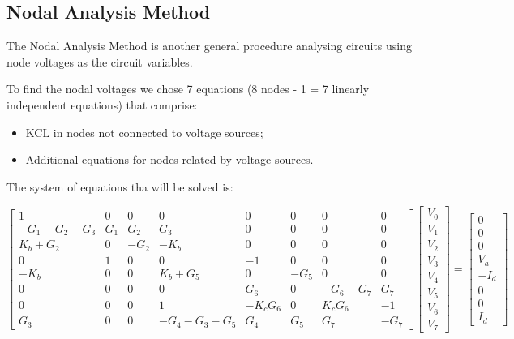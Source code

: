 \subsection{Nodal Analysis Method}

\hspace{0,5cm} The Nodal Analysis Method is another general procedure analysing circuits using node voltages as the circuit variables. 

To find the nodal voltages we chose 7 equations (8 nodes - 1 = 7 linearly independent equations) that comprise:
\begin{itemize}
\item  KCL in nodes not connected to voltage sources;
\item Additional equations for nodes related by voltage sources.
\end{itemize}


The system of equations tha will be solved is:

\begin{equation}
\begin{bmatrix} 
1 & 0 & 0 & 0 & 0 & 0 & 0 & 0 \\
-G_1 - G_2 - G_3 & G_1 & G_2 & G_3 & 0 & 0 & 0 & 0 \\
K_b + G_2 & 0 & -G_2 & -K_b & 0 & 0 & 0 & 0 \\
0 & 1 & 0 & 0 & -1 & 0 & 0 & 0 \\
-K_b & 0 & 0 & K_b + G_5 & 0 & -G_5 & 0 & 0 \\
0 & 0 & 0 & 0 & G_6 & 0 & -G_6 - G_7 & G_7 \\
0 & 0 & 0 & 1 & -K_c G_6 & 0 & K_c G_6 & -1 \\
G_3 & 0 & 0 & -G_4 - G_3 - G_5 & G_4 & G_5 & G_7 & -G_7
\end{bmatrix} 
\begin{bmatrix} 
V_0 \\ 
V_1 \\ 
V_2 \\ 
V_3 \\ 
V_4 \\ 
V_5 \\ 
V_6 \\ 
V_7
\end{bmatrix} =
\begin{bmatrix} 
0\\ 
0 \\ 
0 \\ 
V_a \\
-I_d \\ 
0 \\ 
0 \\ 
I_d
\end{bmatrix}
\end{equation}


